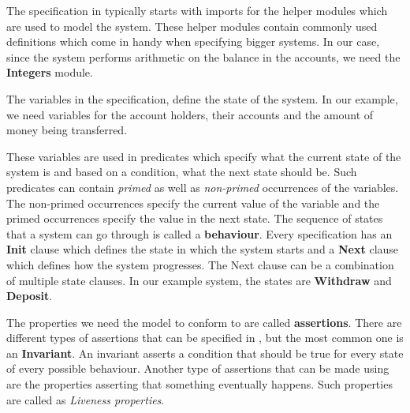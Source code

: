 \documentclass[fleqn]{tukseminar}
\begin{document}
			
			The specification in \tla typically starts with imports for the helper modules which are used to model the system. These helper modules contain commonly used definitions which come in handy when specifying bigger systems. In our case, since the system performs arithmetic on the balance in the accounts, we need the \textbf{Integers} module.
			
			The variables in the specification, define the state of the system. In our example, we need variables for the account holders, their accounts and the amount of money being transferred. 
			
			These variables are used in predicates which specify what the current state of the system is and based on a condition, what the next state should be. Such predicates can contain \textit{primed} as well as \textit{non-primed} occurrences of the variables. The non-primed occurrences specify the current value of the variable and the primed occurrences specify the value in the next state. The sequence of states that a system can go through is called a \textbf{behaviour}. Every specification has an \textbf{Init} clause which defines the state in which the system starts and a \textbf{Next} clause which defines how the system progresses. The Next clause can be a combination of multiple state clauses. In our example system, the states are \textbf{Withdraw} and \textbf{Deposit}. 
			
			The properties we need the model to conform to are called \textbf{assertions}. There are different types of assertions that can be specified in \tla, but the most common one is an \textbf{Invariant}. An invariant asserts a condition that should be true for every state of every possible behaviour. Another type of assertions that can be made using \tla are the properties asserting that something eventually happens. Such properties are called as \textit{Liveness properties}.
			
\end{document}
